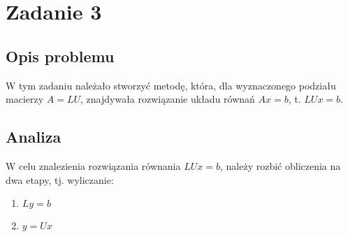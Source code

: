 \section{Zadanie 3}
\subsection{Opis problemu}
W tym zadaniu należało stworzyć metodę, która, dla wyznaczonego podziału macierzy $A = LU$, znajdywała rozwiązanie układu równań $ Ax = b$, t. $LU x = b$.
\subsection{Analiza}
W celu znalezienia rozwiązania równania $LU x = b$, należy rozbić obliczenia na dwa etapy, tj. wyliczanie:
\begin{enumerate}
  \item $ Ly = b $
  \item $ y = Ux $
\end{enumerate}
